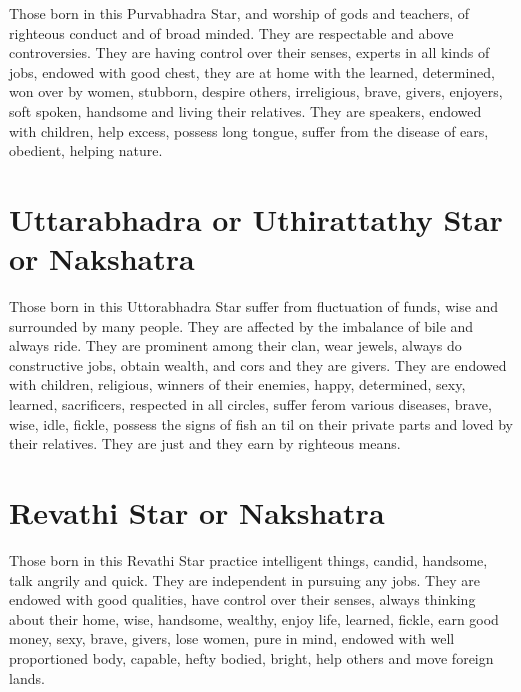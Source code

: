 \documentclass[12pt, right open]{memoir}
\begin{document}
Those born in this Purvabhadra Star, and worship of gods and teachers, of righteous conduct and of broad minded. They are respectable and above controversies. They are having control over their senses, experts in all kinds of jobs, endowed with good chest, they are at home with the learned, determined, won over by women, stubborn, despire others, irreligious, brave, givers, enjoyers, soft spoken, handsome and living their relatives. They are speakers, endowed with children, help excess, possess long tongue, suffer from the disease of ears, obedient, helping nature.


\section{Uttarabhadra or Uthirattathy Star or Nakshatra}

Those born in this Uttorabhadra Star suffer from fluctuation of funds, wise and surrounded by many people. They are affected by the imbalance of bile and always ride. They are prominent among their clan, wear jewels, always do constructive jobs, obtain wealth, and cors and they are givers. They are endowed with children, religious, winners of their enemies, happy, determined, sexy, learned, sacrificers, respected in all circles, suffer ferom various diseases, brave, wise, idle, fickle, possess the signs of fish an til on their private parts and loved by their relatives. They are just and they earn by righteous means.


\section{Revathi Star or Nakshatra}

Those born in this Revathi Star practice intelligent things, candid, handsome, talk angrily and quick. They are independent in pursuing any jobs. They are endowed with good qualities, have control over their senses, always thinking about their home, wise, handsome, wealthy, enjoy life, learned, fickle, earn good money, sexy, brave, givers, lose women, pure in mind, endowed with well proportioned body, capable, hefty bodied, bright, help others and move foreign lands.
\end{document}
